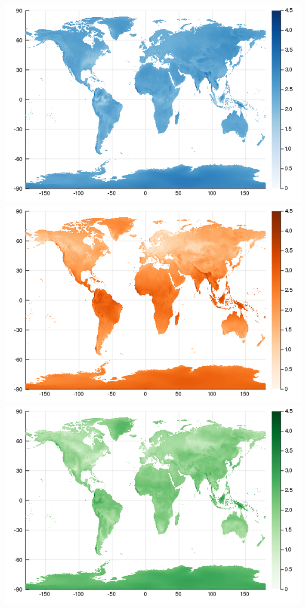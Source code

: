 \includegraphics{figures/envirodistance_mutualism.png}
\includegraphics{figures/envirodistance_parasitism.png}
\includegraphics{figures/envirodistance_predation.png}

